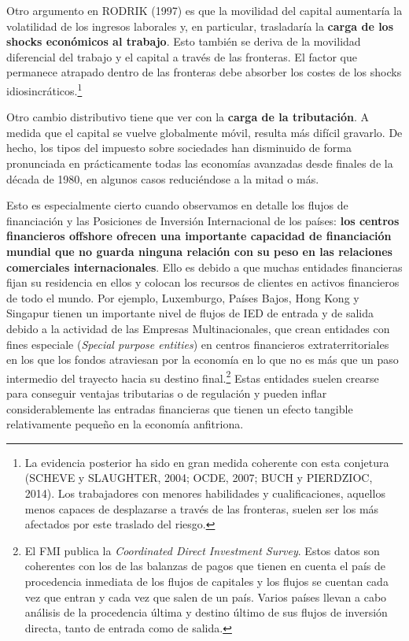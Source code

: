 \documentclass[10pt,a4paper]{article}
\begin{document}
Otro argumento en RODRIK (1997) es que la movilidad del capital aumentaría la volatilidad de los ingresos laborales y, en particular, trasladaría la \textbf{carga de los shocks económicos al trabajo}. Esto también se deriva de la movilidad diferencial del trabajo y el capital a través de las fronteras. El factor que permanece atrapado dentro de las fronteras debe absorber los costes de los shocks idiosincráticos.\footnote{%
    La evidencia posterior ha sido en gran medida coherente con esta conjetura (SCHEVE y SLAUGHTER, 2004; OCDE, 2007; BUCH y PIERDZIOC, 2014). Los trabajadores con menores habilidades y cualificaciones, aquellos menos capaces de desplazarse a través de las fronteras, suelen ser los más afectados por este traslado del riesgo.
}

Otro cambio distributivo tiene que ver con la \textbf{carga de la tributación}. A medida que el capital se vuelve globalmente móvil, resulta más difícil gravarlo. De hecho, los tipos del impuesto sobre sociedades han disminuido de forma pronunciada en prácticamente todas las economías avanzadas desde finales de la década de 1980, en algunos casos reduciéndose a la mitad o más. 

Esto es especialmente cierto cuando observamos en detalle los flujos de financiación y las Posiciones de Inversión Internacional de los países: \textbf{los centros financieros offshore ofrecen una importante capacidad de financiación mundial que no guarda ninguna relación con su peso en las relaciones comerciales internacionales}. Ello es debido a que muchas entidades financieras fijan su residencia en ellos y colocan los recursos de clientes en activos financieros de todo el mundo. Por ejemplo, Luxemburgo, Países Bajos, Hong Kong y Singapur tienen un importante nivel de flujos de IED de entrada y de salida debido a la actividad de las Empresas Multinacionales, que crean entidades con fines especiale (\textit{Special purpose entities}) en centros financieros extraterritoriales en los que los fondos atraviesan por la economía en lo que no es más que un paso intermedio del trayecto hacia su destino final.\footnote{%
    El FMI publica la \textit{Coordinated Direct Investment Survey}. Estos datos son coherentes con los de las balanzas de pagos que tienen en cuenta el país de procedencia inmediata de los flujos de capitales y los flujos se cuentan cada vez que entran y cada vez que salen de un país. Varios países llevan a cabo análisis de la procedencia última y destino último de sus flujos de inversión directa, tanto de entrada como de salida.
} Estas entidades suelen crearse para conseguir ventajas tributarias o de regulación y pueden inflar considerablemente las entradas financieras que tienen un efecto tangible relativamente pequeño en la economía anfitriona. 
\end{document}
